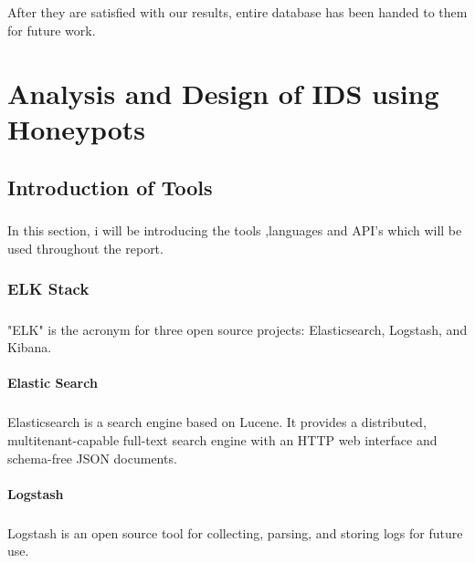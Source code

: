 \documentclass{report}
\begin{document}
\paragraph{}
After they are satisfied with our results, entire database has been handed to them for future work.

\newpage
\chapter{Analysis and Design of IDS using Honeypots}

\section{Introduction of Tools}

\paragraph{}
In this section, i will be introducing the tools ,languages and API's which will be used throughout the report.

\subsection{ELK Stack}
\paragraph{}
"ELK" is the acronym for three open source projects: Elasticsearch, Logstash, and Kibana.

\subsubsection{Elastic Search}

\paragraph{}
Elasticsearch is a search engine based on Lucene. It provides a distributed, multitenant-capable full-text search engine with an HTTP web interface and schema-free JSON documents.

\subsubsection{Logstash}

\paragraph{}
Logstash is an open source tool for collecting, parsing, and storing logs for future use.
\end{document}
